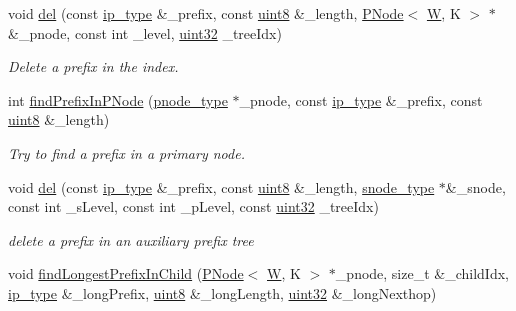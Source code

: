 \begin{DoxyCompactItemize}
void \hyperlink{classRMPTree_a4b15911964ac9d5312248c5c13f33077}{del} (const \hyperlink{classRMPTree_a3dc76d54f334071d8a2bac2422db0159}{ip\-\_\-type} \&\-\_\-prefix, const \hyperlink{types_8h_a34ecedcf03a70dc91e4616212d79267d}{uint8} \&\-\_\-length, \hyperlink{structPNode}{P\-Node}$<$ \hyperlink{test__u128_8cpp_ab21b528bc38899d04d3a7053e52fb797}{W}, K $>$ $\ast$\&\-\_\-pnode, const int \-\_\-level, \hyperlink{types_8h_abd01e8e67e3d94cab04ecaaf4f85ac1b}{uint32} \-\_\-tree\-Idx)
\begin{DoxyCompactList}\small\item\em Delete a prefix in the index. \end{DoxyCompactList}\item 
int \hyperlink{classRMPTree_a49b3605159043ab336af2f31c218cf9c}{find\-Prefix\-In\-P\-Node} (\hyperlink{classRMPTree_ac37da419a61106e5996632fc83670959}{pnode\-\_\-type} $\ast$\-\_\-pnode, const \hyperlink{classRMPTree_a3dc76d54f334071d8a2bac2422db0159}{ip\-\_\-type} \&\-\_\-prefix, const \hyperlink{types_8h_a34ecedcf03a70dc91e4616212d79267d}{uint8} \&\-\_\-length)
\begin{DoxyCompactList}\small\item\em Try to find a prefix in a primary node. \end{DoxyCompactList}\item 
void \hyperlink{classRMPTree_ae74702ea82f7bb98eba8ce5cb1ccc98c}{del} (const \hyperlink{classRMPTree_a3dc76d54f334071d8a2bac2422db0159}{ip\-\_\-type} \&\-\_\-prefix, const \hyperlink{types_8h_a34ecedcf03a70dc91e4616212d79267d}{uint8} \&\-\_\-length, \hyperlink{classRMPTree_ade23f0b765f589613fe10d6cbab738e2}{snode\-\_\-type} $\ast$\&\-\_\-snode, const int \-\_\-s\-Level, const int \-\_\-p\-Level, const \hyperlink{types_8h_abd01e8e67e3d94cab04ecaaf4f85ac1b}{uint32} \-\_\-tree\-Idx)
\begin{DoxyCompactList}\small\item\em delete a prefix in an auxiliary prefix tree \end{DoxyCompactList}\item 
void \hyperlink{classRMPTree_a86e307f0cefe7489a9586a7e2cf8a9a1}{find\-Longest\-Prefix\-In\-Child} (\hyperlink{structPNode}{P\-Node}$<$ \hyperlink{test__u128_8cpp_ab21b528bc38899d04d3a7053e52fb797}{W}, K $>$ $\ast$\-\_\-pnode, size\-\_\-t \&\-\_\-child\-Idx, \hyperlink{classRMPTree_a3dc76d54f334071d8a2bac2422db0159}{ip\-\_\-type} \&\-\_\-long\-Prefix, \hyperlink{types_8h_a34ecedcf03a70dc91e4616212d79267d}{uint8} \&\-\_\-long\-Length, \hyperlink{types_8h_abd01e8e67e3d94cab04ecaaf4f85ac1b}{uint32} \&\-\_\-long\-Nexthop)

\end{DoxyCompactItemize}
